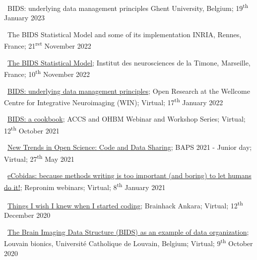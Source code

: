 \textbullet~BIDS: underlying data management principles
Ghent University, Belgium;
19\textsuperscript{th} January 2023

\textbullet~The BIDS Statistical Model and some of its implementation
INRIA, Rennes, France;
21\textsuperscript{rst} November 2022

\textbullet~\href{https://osf.io/jpfrh}
{The BIDS Statistical Model};
Institut des neurosciences de la Timone, Marseille, France;
10\textsuperscript{th} November 2022

\textbullet~\href{https://osf.io/h6gsr/}{BIDS: underlying data management principles};
Open Research at the Wellcome Centre for Integrative Neuroimaging (WIN);
Virtual;
17\textsuperscript{th} January 2022

\textbullet~\href{https://remi-gau.github.io/bids_cookbook/}{BIDS: a cookbook};
ACCS and OHBM Webinar and Workshop Series;
Virtual;
12\textsuperscript{th} October 2021

\textbullet~\href{https://osf.io/6kzn2/}{New Trends in Open Science: Code and Data Sharing};
BAPS 2021 - Junior day;
Virtual;
27\textsuperscript{th} May 2021

\textbullet~\href{https://osf.io/fb7tx/}{eCobidas: because methods writing is too important (and boring) to let humans do it!};
Repronim webinars;
Virtual;
8\textsuperscript{th} January 2021

\textbullet~\href{https://osf.io/vdgua/}{Things I wish I knew when I started coding};
Brainhack Ankara;
Virtual;
12\textsuperscript{th} December 2020

\textbullet~\href{https://osf.io/zf5x8/}{The Brain Imaging Data Structure (BIDS) as an example of data organization};
Louvain bionics, Université Catholique de Louvain, Belgium;
Virtual;
9\textsuperscript{th} October 2020
